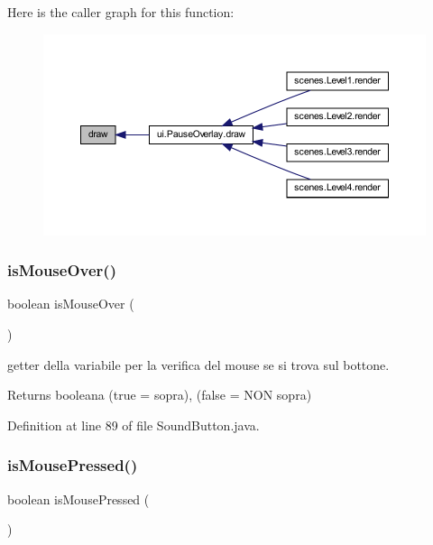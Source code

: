 Here is the caller graph for this function\+:\nopagebreak
\begin{figure}[H]
\begin{center}
\leavevmode
\includegraphics[width=350pt]{classui_1_1_sound_button_a72fe1ffca978e99fd16994a10e7f8051_icgraph}
\end{center}
\end{figure}
\mbox{\label{classui_1_1_sound_button_a2deebd864f1c01a6d81238349c929885}} 
\subsubsection{\texorpdfstring{is\+Mouse\+Over()}{isMouseOver()}}
{\footnotesize\ttfamily boolean is\+Mouse\+Over (\begin{DoxyParamCaption}{ }\end{DoxyParamCaption})}



getter della variabile per la verifica del mouse se si trova sul bottone. 

\begin{DoxyReturn}{Returns}
booleana (true = sopra), (false = N\+ON sopra) 
\end{DoxyReturn}


Definition at line 89 of file Sound\+Button.\+java.

\mbox{\label{classui_1_1_sound_button_ad47389f2ab3067af3626db75a6b3b09e}} 
\subsubsection{\texorpdfstring{is\+Mouse\+Pressed()}{isMousePressed()}}
{\footnotesize\ttfamily boolean is\+Mouse\+Pressed (\begin{DoxyParamCaption}{ }\end{DoxyParamCaption})}



